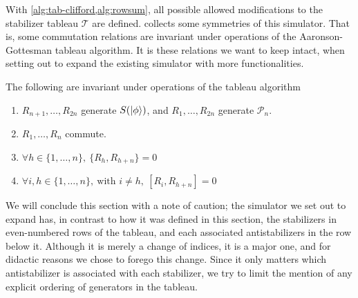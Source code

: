 With \cref{alg:tab-clifford,alg:rowsum}, all possible allowed modifications to
the stabilizer tableau $\mathcal{T}$ are defined.  collects
some symmetries of this simulator. That is, some commutation relations are
invariant under operations of the Aaronson-Gottesman tableau algorithm. It is
these relations we want to keep intact, when setting out to expand the existing
simulator with more functionalities.
\begin{prop}\label{prop:comm-tab}
  The following are invariant under operations of the tableau algorithm
  \begin{enumerate}
    \item $R_{n+1},\ldots,R_{2n}$ generate $S(\ket{\phi})$, and $R_1, \ldots,
      R_{2n}$ generate $\mathcal{P}_n$.
    \item $R_1, \ldots, R_n$ commute.
    \item $\forall h \in \{1,\ldots,n\}, \ \{R_h, R_{h+n}\} = 0$
    \item $\forall i,h \in \{1,\ldots,n\}, \ \text{with } i\neq h, \ [R_i, R_{h+n}] = 0$
  \end{enumerate}
\end{prop}
We will conclude this section with a note of caution; the simulator we set out
to expand has, in contrast to how it was defined in this section, the
stabilizers in even-numbered rows of the tableau, and each associated
antistabilizers in the row below it. Although it is merely a change of indices,
it is a major one, and for didactic reasons we chose to forego this change.
Since it only matters which antistabilizer is associated with each stabilizer,
we try to limit the mention of any explicit ordering of generators in the
tableau.

%
